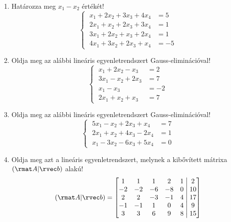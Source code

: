 \documentclass[a4paper, 12pt]{scrartcl}
\begin{document}
\begin{enumerate}
  \item Határozza meg $x_1 - x_2$ értékét!
        $$
          \left\{\;
          \begin{aligned}
            x_1 + 2x_2 + 3x_3 + 4x_4 & = 5  \\
            2x_1 + x_2 + 2x_3 + 3x_4 & = 1  \\
            3x_1 + 2x_2 + x_3 + 2x_4 & = 1  \\
            4x_1 + 3x_2 + 2x_3 + x_4 & = -5
          \end{aligned}
          \right.
        $$

  \item Oldja meg az alábbi lineáris egyenletrendszert Gauss-eliminációval!
        $$
          \left\{\;
          \begin{aligned}
            x_1 + 2x_2 - x_3  & = 2  \\
            3x_1 - x_2 + 2x_3 & = 7  \\
            x_1 - x_3         & = -2 \\
            2x_1 + x_2 + x_3  & = 7
          \end{aligned}
          \right.
        $$

  \item Oldja meg az alábbi lineáris egyenletrendszert Gauss-eliminációval!
        $$
          \left\{\;
          \begin{aligned}
            5x_1 - x_2 + 2x_3 + x_4  & = 7 \\
            2x_1 + x_2 + 4x_3 - 2x_4 & = 1 \\
            x_1 - 3x_2 - 6x_3 + 5x_4 & = 0
          \end{aligned}
          \right.
        $$

  \item Oldja meg azt a lineáris egyenletrendszert, melynek a kibővített mátrixa
        $(\rmat A | \rvec b)$ alakú!
        $$
          (\rmat A | \rvec b) =
          \left[
            \begin{matrix}
              1  & 1  & 1  & 2  & 1 \\
              -2 & -2 & -6 & -8 & 0 \\
              2  & 2  & -3 & -1 & 4 \\
              -1 & -1 & 1  & 0  & 4 \\
              3  & 3  & 6  & 9  & 8 \\
            \end{matrix}
            \;\middle|\;
            \begin{matrix}
              2  \\
              10 \\
              17 \\
              9  \\
              15
            \end{matrix}
          \right]
        $$


\end{enumerate}
\end{document}
